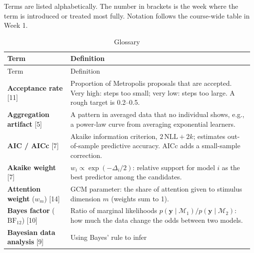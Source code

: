 Terms are listed alphabetically. The number in brackets is the week
where the term is introduced or treated most fully. Notation follows the
course-wide table in Week 1.

\begin{longtable}[]{@{}
  >{\raggedright\arraybackslash}p{}
  >{\raggedright\arraybackslash}p{}@{}}
\caption{\centering Glossary}\tabularnewline
\toprule\noalign{}
\begin{minipage}[b]{\linewidth}\raggedright
Term
\end{minipage} & \begin{minipage}[b]{\linewidth}\raggedright
Definition
\end{minipage} \\
\midrule\noalign{}
\endfirsthead
\toprule\noalign{}
\begin{minipage}[b]{\linewidth}\raggedright
Term
\end{minipage} & \begin{minipage}[b]{\linewidth}\raggedright
Definition
\end{minipage} \\
\midrule\noalign{}
\endhead
\bottomrule\noalign{}
\endlastfoot
\textbf{Acceptance rate} {[}11{]} & Proportion of Metropolis proposals
that are accepted. Very high: steps too small; very low: steps too
large. A rough target is 0.2--0.5. \\
\textbf{Aggregation artifact} {[}5{]} & A pattern in averaged data that
no individual shows, e.g., a power-law curve from averaging exponential
learners. \\
\textbf{AIC / AICc} {[}7{]} & Akaike information criterion,
\(2\,\mathrm{NLL} + 2k\); estimates out-of-sample predictive accuracy.
AICc adds a small-sample correction. \\
\textbf{Akaike weight} {[}7{]} & \(w_i \propto \exp(-\Delta_i/2)\):
relative support for model \(i\) as the best predictor among the
candidates. \\
\textbf{Attention weight} (\(w_m\)) {[}14{]} & GCM parameter: the share
of attention given to stimulus dimension \(m\) (weights sum to 1). \\
\textbf{Bayes factor} (\(\mathrm{BF}_{12}\)) {[}10{]} & Ratio of
marginal likelihoods
\(p(\mathbf{y}\mid\mathcal{M}_1)/p(\mathbf{y}\mid\mathcal{M}_2)\): how
much the data change the odds between two models. \\
\textbf{Bayesian data analysis} {[}9{]} & Using Bayes' rule to infer

\end{longtable}
